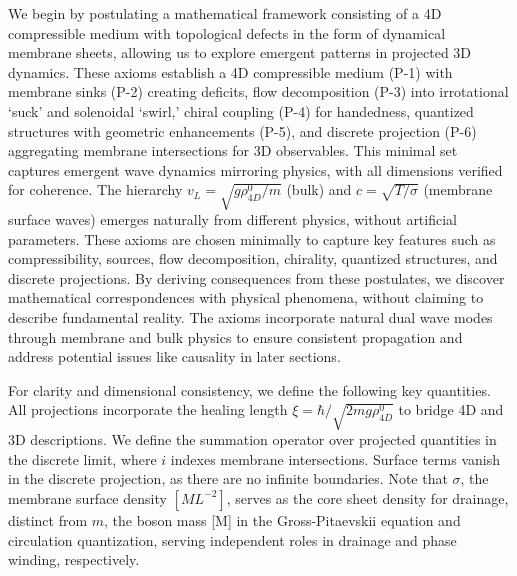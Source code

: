 We begin by postulating a mathematical framework consisting of a 4D compressible medium with topological defects in the form of dynamical membrane sheets, allowing us to explore emergent patterns in projected 3D dynamics. These axioms establish a 4D compressible medium (P-1) with membrane sinks (P-2) creating deficits, flow decomposition (P-3) into irrotational `suck' and solenoidal `swirl,' chiral coupling (P-4) for handedness, quantized structures with geometric enhancements (P-5), and discrete projection (P-6) aggregating membrane intersections for 3D observables. This minimal set captures emergent wave dynamics mirroring physics, with all dimensions verified for coherence. The hierarchy $v_L = \sqrt{g \rho_{4D}^0 / m}$ (bulk) and $c = \sqrt{T / \sigma}$ (membrane surface waves) emerges naturally from different physics, without artificial parameters. These axioms are chosen minimally to capture key features such as compressibility, sources, flow decomposition, chirality, quantized structures, and discrete projections. By deriving consequences from these postulates, we discover mathematical correspondences with physical phenomena, without claiming to describe fundamental reality. The axioms incorporate natural dual wave modes through membrane and bulk physics to ensure consistent propagation and address potential issues like causality in later sections.

For clarity and dimensional consistency, we define the following key quantities. All projections incorporate the healing length $\xi = \hbar / \sqrt{2 m g \rho_{4D}^0}$ to bridge 4D and 3D descriptions. We define the summation operator over projected quantities in the discrete limit, where $i$ indexes membrane intersections. Surface terms vanish in the discrete projection, as there are no infinite boundaries. Note that $\sigma$, the membrane surface density $[M L^{-2}]$, serves as the core sheet density for drainage, distinct from $m$, the boson mass [M] in the Gross-Pitaevskii equation and circulation quantization, serving independent roles in drainage and phase winding, respectively.

